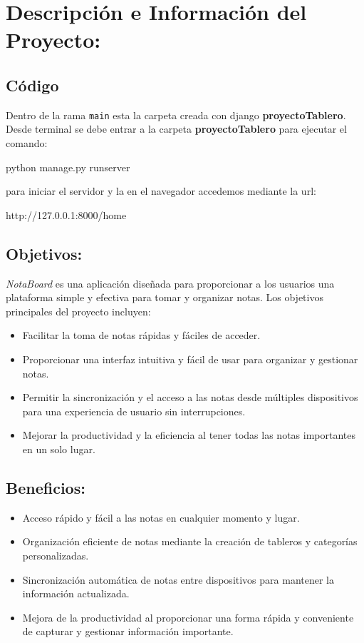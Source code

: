 \section{Descripción e Información del Proyecto:}

\subsection{Código}

Dentro de la rama \texttt{main} esta la carpeta creada con django \textbf{proyectoTablero}.\\ 

Desde terminal se debe entrar a la carpeta \textbf{proyectoTablero} para ejecutar el comando:\\

\begin{center}
    python manage.py runserver    
\end{center}

para iniciar el servidor y la en el navegador accedemos mediante la url:\\

\begin{center}
    http://127.0.0.1:8000/home
\end{center}

\subsection{Objetivos:}

\textit{NotaBoard} es una aplicación diseñada para proporcionar a los usuarios una plataforma simple y efectiva para tomar y organizar notas. Los objetivos principales del proyecto incluyen:
\begin{itemize}
    \item Facilitar la toma de notas rápidas y fáciles de acceder.
    \item Proporcionar una interfaz intuitiva y fácil de usar para organizar y gestionar notas.
    \item Permitir la sincronización y el acceso a las notas desde múltiples dispositivos para una experiencia de usuario sin interrupciones.
    \item Mejorar la productividad y la eficiencia al tener todas las notas importantes en un solo lugar.
\end{itemize}

\subsection{Beneficios:}
\begin{itemize}
    \item Acceso rápido y fácil a las notas en cualquier momento y lugar.
    \item Organización eficiente de notas mediante la creación de tableros y categorías personalizadas.
    \item Sincronización automática de notas entre dispositivos para mantener la información actualizada.
    \item Mejora de la productividad al proporcionar una forma rápida y conveniente de capturar y gestionar información importante.
\end{itemize}

